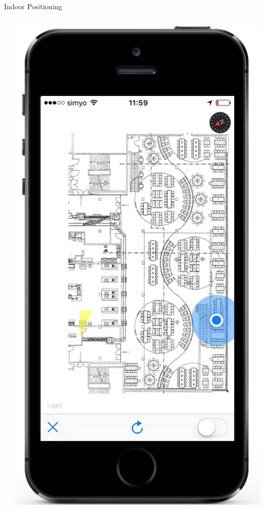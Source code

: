 \documentclass[11pt]{beamer}
\begin{document}
\begin{frame}{Indoor Positioning}
\begin{columns}[T]
\begin{column}{.6\textwidth}
\begin{itemize}
  \end{itemize}
  \end{column}
  \begin{column}{.4\textwidth}
  \includegraphics[scale=0.25]{applesignalgood}
  \end{column}
\end{columns}

\end{frame}
\end{document}
